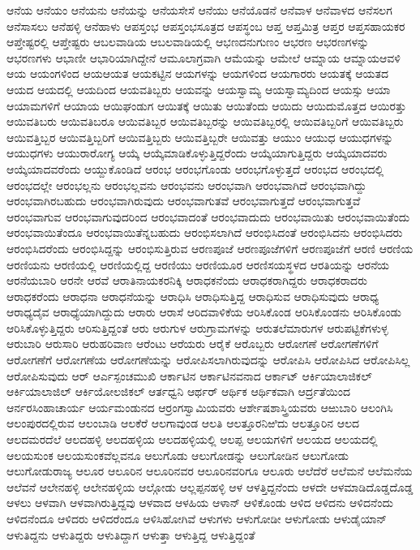 {ಆನೆಯ
ಆನೆಯಂ
ಆನೆಯನು
ಆನೆಯನ್ನು
ಆನೆಯಸೇಸೆ
ಆನೆಯು
ಆನೆಯೊಡನೆ
ಆನೆವಾಳ
ಆನೆವಾಳದ
ಆನೆಸಲಗ
ಆನೆಸಾಸಲು
ಆನೆಹಳ್ಳಿ
ಆನೆಹಾಳು
ಆಪಸ್ತಂಭ
ಆಪಸ್ತಂಭಸೂತ್ರದ
ಆಪಸ್ಥಂಬ
ಆಪ್ತ
ಆಪ್ತಮಿತ್ರ
ಆಪ್ತರ
ಆಪ್ತಸಹಾಯಕರ
ಆಪ್ತೇಷ್ಟರಲ್ಲಿ
ಆಪ್ತೇಷ್ಟರು
ಆಬಲವಾಡಿಯ
ಆಬಲವಾಡಿಯಲ್ಲಿ
ಆಭಣದನುಗುಣಂ
ಆಭರಣ
ಆಭರಣಗಳನ್ನು
ಆಭರಣಗಳು
ಆಭಾಣೀ
ಆಭಾರಿಯಾಗಿದ್ದೇನೆ
ಆಮೂಲಾಗ್ರವಾಗಿ
ಆಮೆಯನ್ನು
ಆಮೇಲೆ
ಆಮ್ನಾಯ
ಆಮ್ನಾಯಆವಳಿ
ಆಯ
ಆಯಂಗಳಿಂದ
ಆಯಆಯತ
ಆಯಕಟ್ಟಿನ
ಆಯಗಳನ್ನು
ಆಯಗಳಿಂದ
ಆಯಗಾರರು
ಆಯತಕ್ಕೆ
ಆಯತದ
ಆಯದ
ಆಯದಲ್ಲಿ
ಆಯದಿಂದ
ಆಯವತಿಬ್ಬರು
ಆಯವನ್ನು
ಆಯಸ್ವಾಮ್ಯ
ಆಯಸ್ವಾಮ್ಯದಿಂದ
ಆಯಸ್ಸು
ಆಯಾ
ಆಯಾಮಗಳಿಗೆ
ಆಯಾಯ
ಆಯಿಘಂಡುಗ
ಆಯಿತಕ್ಕೆ
ಆಯಿತು
ಆಯಿತೆಂದು
ಆಯಿದು
ಆಯಿದುಮೊತ್ತದ
ಆಯಿರತ್ತು
ಆಯಿವತಿಬರು
ಆಯಿವತಿಬರೂ
ಆಯಿವತಿಬ್ಬರ
ಆಯಿವತಿಬ್ಬರನ್ನು
ಆಯಿವತಿಬ್ಬರಲ್ಲಿ
ಆಯಿವತಿಬ್ಬರಿಗೆ
ಆಯಿವತಿಬ್ಬರು
ಆಯಿವತ್ತಿಬ್ಬರ
ಆಯಿವತ್ತಿಬ್ಬರಿಗೆ
ಆಯಿವತ್ತಿಬ್ಬರು
ಆಯಿವತ್ತಿಬ್ಬರೇ
ಆಯಿವತ್ತು
ಆಯುಂ
ಆಯುಧ
ಆಯುಧಗಳನ್ನು
ಆಯುಧಗಳು
ಆಯುರಾರೋಗ್ಯ
ಆಯ್ಕೆ
ಆಯ್ಕೆಮಾಡಿಕೊಳ್ಳುತ್ತಿದ್ದರೆಂದು
ಆಯ್ಕೆಯಾಗುತ್ತಿದ್ದರು
ಆಯ್ಕೆಯಾದವರು
ಆಯ್ಕೆಯಾದವರೆಂದು
ಆಯ್ದುಕೊಂಡಿದೆ
ಆರಂಭ
ಆರಂಭಗೊಂಡು
ಆರಂಭಗೊಳ್ಳುತ್ತದೆ
ಆರಂಭದ
ಆರಂಭದಲ್ಲಿ
ಆರಂಭದಲ್ಲೇ
ಆರಂಭಲ್ಲನು
ಆರಂಭಲ್ಲವನು
ಆರಂಭವನು
ಆರಂಭವಾಗಿ
ಆರಂಭವಾಗಿದೆ
ಆರಂಭವಾಗಿದ್ದು
ಆರಂಭವಾಗಿರಬಹುದು
ಆರಂಭವಾಗಿರುವುದು
ಆರಂಭವಾಗುತವೆ
ಆರಂಭವಾಗುತ್ತದೆ
ಆರಂಭವಾಗುತ್ತವೆ
ಆರಂಭವಾಗುವ
ಆರಂಭವಾಗುವುದರಿಂದ
ಆರಂಭವಾದಂತೆ
ಆರಂಭವಾದುದು
ಆರಂಭವಾಯಿತು
ಆರಂಭವಾಯಿತೆಂದು
ಆರಂಭವಾಯಿತೆಂದೂ
ಆರಂಭವಾಯಿತೆನ್ನಬಹುದು
ಆರಂಭಿಸಲಾಗಿದೆ
ಆರಂಭಿಸಿದಂತೆ
ಆರಂಭಿಸಿದನು
ಆರಂಭಿಸಿದರು
ಆರಂಭಿಸಿದರೆಂದು
ಆರಂಭಿಸಿದ್ದನ್ನು
ಆರಂಭಿಸುತ್ತಿರುವ
ಆರಣಪೂಜೆ
ಆರಣಪೂಜೆಗಳಿಗೆ
ಆರಣಪೂಜೆಗೆ
ಆರಣಿ
ಆರಣಿಯ
ಆರಣಿಯನು
ಆರಣಿಯಲ್ಲಿ
ಆರಣಿಯಲ್ಲಿದ್ದ
ಆರಣಿಯು
ಆರಣಿಯೂರ
ಆರಣಿಸಯಸ್ಥಳದ
ಆರತಿಯನ್ನು
ಆರನೆಯ
ಆರನೆಯಬಾರಿ
ಆರನೇ
ಆರವೆ
ಆರಾತಿನಾಯಕರನಿಕ್ಕಿ
ಆರಾಧಕನೆಂದು
ಆರಾಧಕರಾಗಿದ್ದರು
ಆರಾಧಕರಾದರು
ಆರಾಧಕರೆಂದು
ಆರಾಧನಾ
ಆರಾಧನೆಯನ್ನು
ಆರಾಧಿಸಿ
ಆರಾಧಿಸುತ್ತಿದ್ದ
ಆರಾಧಿಸುವ
ಆರಾಧಿಸುವುದು
ಆರಾಧ್ಯ
ಆರಾಧ್ಯದೈವ
ಆರಾಧ್ಯೆಯಾಗಿದ್ದುದು
ಆರಾರು
ಆರಾಸೆ
ಆರಿದವಾಳಿಕೆಯ
ಆರಿಸಿಕೊಂಡ
ಆರಿಸಿಕೊಂಡನು
ಆರಿಸಿಕೊಂಡು
ಆರಿಸಿಕೊಳ್ಳುತ್ತಿದ್ದರು
ಆರಿಸುತ್ತಿದ್ದಂತೆ
ಆರು
ಆರುಗುಳ
ಆರುಗ್ರಾಮಗಳನ್ನು
ಆರುತಲೆಮಾರುಗಳ
ಆರುಪಟ್ಟಿಕೆಗಳುಳ್ಳ
ಆರುಬಾರಿ
ಆರುಸಾರಿ
ಆರುಹರಿವಾಣ
ಆರೆಂಟು
ಆರೆಯರು
ಆರೈಕೆ
ಆರೊಬ್ಬರು
ಆರೋಗಣೆ
ಆರೋಗಣೆಗಳಿಗೆ
ಆರೋಗಣೆಗೆ
ಆರೋಗಣೆಯ
ಆರೋಗಣೆಯನ್ನು
ಆರೋಪಿಸಲಾಗಿರುವುದನ್ನು
ಆರೋಪಿಸಿ
ಆರೋಪಿಸಿದ
ಆರೋಪಿಸಿಲ್ಲ
ಆರೋಪಿಸುವುದು
ಆರ್
ಆರ್ಎಸ್ಪಂಚಮುಖಿ
ಆರ್ಕಾಟಿನ
ಆರ್ಕಾಟಿನವನಾದ
ಆರ್ಕಾಟ್
ಆರ್ಕಿಯಾಲಾಜಿಕಲ್
ಆರ್ಕಿಯಾಲಾಜಿಲ್
ಆರ್ಕಿಯೋಲಜಿಕಲ್
ಆರ್ತಧ್ವನಿ
ಆರ್ಥರ್
ಆರ್ಥಿಕ
ಆರ್ಥಿಕವಾಗಿ
ಆರ್ದ್ರತೆಯಿಂದ
ಆರ್ನರಸಿಂಹಾಚಾರ್ಯ
ಆರ್ಯಮಂಡುನದ
ಆರ್ರಂಗಸ್ವಾಮಿಯವರು
ಆರ್ಶೇಷಶಾಸ್ತ್ರಿಯವರು
ಆಱುಬಾರಿ
ಆಲಂಗಿಸಿ
ಆಲಂಪುರದಲ್ಲಿರುವ
ಆಲಂಬಾಡಿ
ಆಲಕೆರೆ
ಆಲಗಾವುಂಡ
ಆಲತಿ
ಆಲತ್ತೂರನಿಱಿದು
ಆಲತ್ತೂರಿನ
ಆಲದ
ಆಲದಮರದೆಲೆ
ಆಲದಹಳ್ಳಿ
ಆಲದಹಳ್ಳಿಯ
ಆಲದಹಳ್ಳಿಯಲ್ಲಿ
ಆಲಪ್ಪ
ಆಲಯಗಳಿಗೆ
ಆಲಯದ
ಆಲಯದಲ್ಲಿ
ಆಲಯಸುಂಕ
ಆಲಯಸುಂಕವೆಲ್ಲವನೂ
ಆಲುಗೊಡು
ಆಲುಗೋಡನ್ನು
ಆಲುಗೋಡಿನ
ಆಲುಗೋಡು
ಆಲುಗೋಡುರಾಜ್ಯ
ಆಲೂರ
ಆಲೂರಿನ
ಆಲೂರಿನವರ
ಆಲೂರಿನವರಿಗೂ
ಆಲೂರು
ಆಲೆದೆರೆ
ಆಲೆಮನೆ
ಆಲೆಮನೆಯ
ಆಲೆವನೆ
ಆಲೇನಹಳ್ಳಿ
ಆಲೇನಹಳ್ಳಿಯ
ಆಲ್ಗೋಡು
ಆಲ್ಲಪ್ಪನಹಳ್ಳಿ
ಆಳ
ಆಳತ್ತಿದ್ದನೆಂದು
ಆಳದೇ
ಆಳಮಾಡಿದೊಡ್ಡದೊಡ್ಡ
ಆಳಲು
ಆಳವಾಗಿ
ಆಳವಾಗಿರುತ್ತಿದ್ದವು
ಆಳವಾದ
ಆಳಹಿಯ
ಆಳಾನ್
ಆಳಿಕೊಂಡು
ಆಳಿದ
ಆಳಿದನು
ಆಳಿದನೆಂದು
ಆಳಿದನೆಂದೂ
ಆಳಿದರು
ಆಳಿದರೆಂದೂ
ಆಳಿಸಿಹೋಗಿವೆ
ಆಳುಗಳು
ಆಳುಗೋಡೀ
ಆಳುಗೋಡು
ಆಳುಡೈಯಾನ್
ಆಳುತಿದ್ದನು
ಆಳುತಿದ್ದರು
ಆಳುತಿದ್ದಾಗ
ಆಳುತ್ತಾ
ಆಳುತ್ತಿದ್ದ
ಆಳುತ್ತಿದ್ದಂತೆ
}
